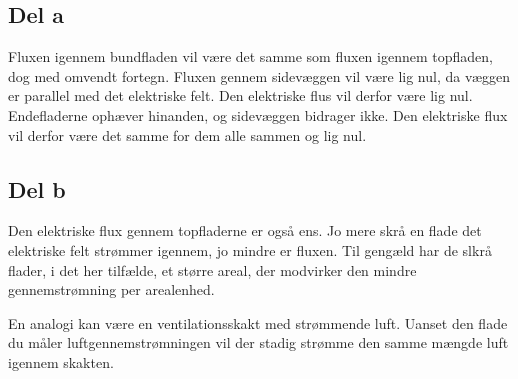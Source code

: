 \subsection{Del a} %
\label{sub:del_a}
Fluxen igennem bundfladen vil være det samme som fluxen igennem topfladen, dog med omvendt fortegn. Fluxen gennem sidevæggen vil være lig nul, da væggen er parallel med det elektriske felt. Den elektriske flus vil derfor være lig nul. Endefladerne ophæver hinanden, og sidevæggen  bidrager ikke. Den elektriske flux vil derfor være det samme for dem alle sammen og lig nul.

\subsection{Del b} %
\label{sub:del_b}
Den elektriske flux gennem topfladerne er også ens. Jo mere skrå en flade det elektriske felt strømmer igennem, jo mindre er fluxen. Til gengæld har de slkrå flader, i det her tilfælde, et større areal, der modvirker den mindre gennemstrømning per arealenhed.

En analogi kan være en ventilationsskakt med strømmende luft. Uanset den flade du måler luftgennemstrømningen vil der stadig strømme den samme mængde luft igennem skakten.
